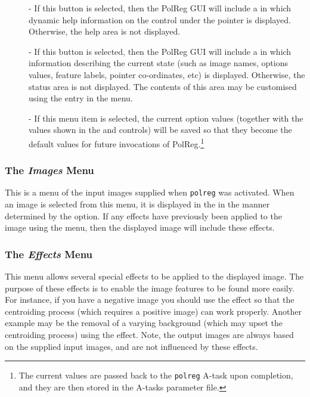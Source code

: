 \begin{description}
\item [] - 
If this button is selected, then the PolReg GUI will include a
 in which dynamic help information
on the control under the pointer is displayed. Otherwise, the help area
is not displayed.

\item [] - 
If this button is selected, then the PolReg GUI will include a
 in which information
describing the current state (such as image names, options values, 
feature labels, pointer co-ordinates, etc) is displayed. Otherwise, the
status area is not displayed. The contents of this area may be customised
using the  entry in the
 menu.

\item [] - 
If this menu item is selected, the current option values (together with
the values shown in the 
and  controls) will be saved so that
they become the default values for future invocations of
PolReg.\footnote{The current values are passed back to the {\tt polreg} A-task 
upon completion, and they are then stored in the A-tasks parameter file.}

\end{description} 

\subsubsection {The {\em Images} Menu}
This is a menu of the input images supplied when {\tt polreg} was
activated. When an image is selected from this menu, it is displayed in
the  in the manner
determined by the  option. If any
effects have previously been applied to the image using the  menu, then the displayed image will
include these effects.

\subsubsection {The {\em Effects} Menu}
This menu allows several special effects to be applied to the displayed
image. The purpose of these effects is to enable the image features to be
found more easily. For instance, if you have a negative image you should
use the  effect so that the
centroiding process (which requires a positive image) can work properly.
Another example may be the removal of a varying background (which may upset
the centroiding process) using the
 effect. Note, the output
images are always based on the supplied input images, and are not
influenced by these effects.

